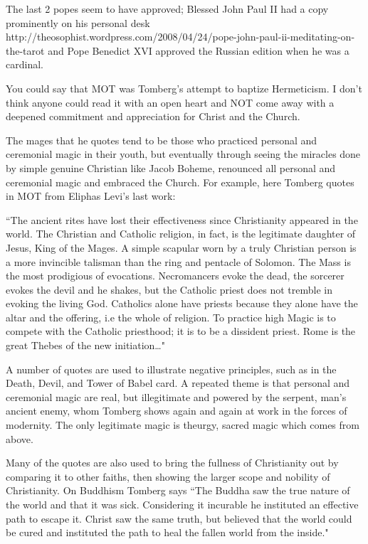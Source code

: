 \begin{footnotesize}
\begin{sffamily}
The last 2 popes seem to have approved; Blessed John Paul II had a copy prominently on his personal desk http://theosophist.wordpress.com/2008/04/24/pope-john-paul-ii-meditating-on-the-tarot and Pope Benedict XVI approved the Russian edition when he was a cardinal. 

You could say that MOT was Tomberg's attempt to baptize Hermeticism. I don't think anyone could read it with an open heart and NOT come away with a deepened commitment and appreciation for Christ and the Church. 

The mages that he quotes tend to be those who practiced personal and ceremonial magic in their youth, but eventually through seeing the miracles done by simple genuine Christian like Jacob Boheme, renounced all personal and ceremonial magic and embraced the Church. For example, here Tomberg quotes in MOT from Eliphas Levi's last work:

``The ancient rites have lost their effectiveness since Christianity appeared in the world. The Christian and Catholic religion, in fact, is the legitimate daughter of Jesus, King of the Mages. A simple scapular worn by a truly Christian person is a more invincible talisman than the ring and pentacle of Solomon. The Mass is the most prodigious of evocations. Necromancers evoke the dead, the sorcerer evokes the devil and he shakes, but the Catholic priest does not tremble in evoking the living God. Catholics alone have priests because they alone have the altar and the offering, i.e the whole of religion. To practice high Magic is to compete with the Catholic priesthood; it is to be a dissident priest. Rome is the great Thebes of the new initiation…" 

A number of quotes are used to illustrate negative principles, such as in the Death, Devil, and Tower of Babel card. A repeated theme is that personal and ceremonial magic are real, but illegitimate and powered by the serpent, man's ancient enemy, whom Tomberg shows again and again at work in the forces of modernity. The only legitimate magic is theurgy, sacred magic which comes from above.

Many of the quotes are also used to bring the fullness of Christianity out by comparing it to other faiths, then showing the larger scope and nobility of Christianity. On Buddhism Tomberg says ``The Buddha saw the true nature of the world and that it was sick. Considering it incurable he instituted an effective path to escape it. Christ saw the same truth, but believed that the world could be cured and instituted the path to heal the fallen world from the inside." 


\end{sffamily}
\end{footnotesize}
